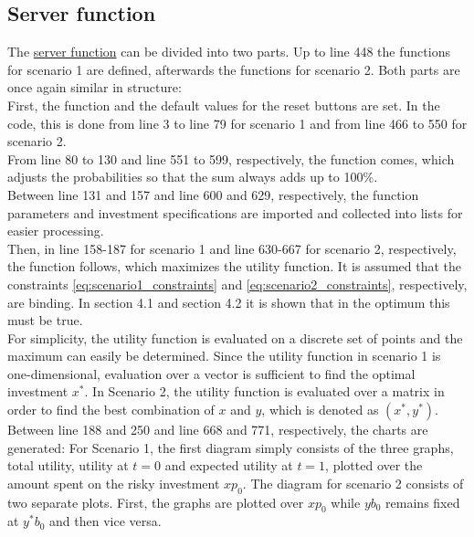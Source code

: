 \bigskip

\subsection{Server function}

\noindent The \hyperlink{Server function}{server function} can be divided into two parts. Up to line 448 the functions for scenario 1 are defined, afterwards the functions for scenario 2. Both parts are once again similar in structure:\\

\noindent First, the function and the default values for the reset buttons are set. In the code, this is done from line 3 to line 79 for scenario 1 and from line 466 to 550 for scenario 2.\\

\noindent From line 80 to 130 and line 551 to 599, respectively, the function comes, which adjusts the probabilities so that the sum always adds up to 100\%.\\

\noindent Between line 131 and 157 and line 600 and 629, respectively, the function parameters and investment specifications are imported and collected into lists for easier processing.\\

\noindent Then, in line 158-187 for scenario 1 and line 630-667 for scenario 2, respectively, the function follows, which maximizes the utility function. It is assumed that the constraints \eqref{eq:scenario1_constraints} and \eqref{eq:scenario2_constraints}, respectively, are binding. In section 4.1 and section 4.2 it is shown that in the optimum this must be true.\\
For simplicity, the utility function is evaluated on a discrete set of points and the maximum can easily be determined. Since the utility function in scenario 1 is one-dimensional, evaluation over a vector is sufficient to find the optimal investment $x^*$. In Scenario 2, the utility function is evaluated over a matrix in order to find the best combination of $x$ and $y$, which is denoted as $(x^*, y^*)$.\\

\noindent Between line 188 and 250 and line 668 and 771, respectively, the charts are generated: For Scenario 1, the first diagram simply consists of the three graphs, total utility, utility at $t=0$ and expected utility at $t=1$, plotted over the amount spent on the risky investment $xp_0$. The diagram for scenario 2 consists of two separate plots. First, the graphs are plotted over $xp_0$ while $yb_0$ remains fixed at $y^*b_0$ and then vice versa.\\

